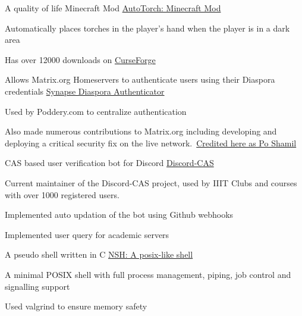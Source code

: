 \begin{cventries}
    
    \cventry
    {A quality of life Minecraft Mod} %
    {\href{https://www.curseforge.com/minecraft/mc-mods/auto-torch}{AutoTorch: Minecraft Mod}} %
    {} %
    {} %
    {
      \begin{cvitems} %
        \item {Automatically places torches in the player's hand when the player is in a dark area}
        \item {Has over 12000 downloads on \href{https://www.curseforge.com/minecraft/mc-mods/auto-torch}{CurseForge}}
    \end{cvitems}
    }
       
     
    \cventry
    {Allows Matrix.org Homeservers to authenticate users using their Diaspora credentials} %
    {\href{https://matrix.org/docs/projects/other/synapse-diaspora-auth}{Synapse Diaspora Authenticator}} %
    {} %
    {} %
    {
      \begin{cvitems} %
        \item {Used by Poddery.com to centralize authentication}
        \item {Also made numerous contributions to Matrix.org including developing and deploying a critical security fix on the live network.\
         \href{https://matrix.org/blog/2018/05/01/security-update-synapse-0-28-1/}{Credited here as Po Shamil}}
      \end{cvitems}
    }
    
    
    \cventry
    {CAS based user verification bot for Discord} %
    {\href{https://github.com/Opensource-IIITH/Discord-CAS}{Discord-CAS}} %
    {} %
    {} %
    {
      \begin{cvitems} %
        \item {Current maintainer of the Discord-CAS project, used by IIIT Clubs and courses with over 1000 registered users.}
        \item {Implemented auto updation of the bot using Github webhooks}
        \item {Implemented user query for academic servers}
      \end{cvitems}
    }
    
    
    \cventry
    {A pseudo shell written in C} %
    {\href{https://github.com/necessary129/nsh}{NSH: A posix-like shell}} %
    {} %
    {} %
    {
      \begin{cvitems} %
          \item {A minimal POSIX shell with full process management, piping, job control and signalling support}
          \item {Used valgrind to ensure memory safety}
      \end{cvitems}
    }
\end{cventries}
